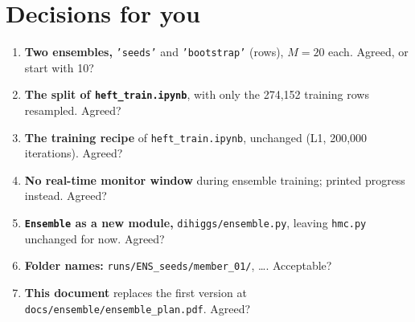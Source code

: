 \documentclass[11pt]{article}
\newcommand{\file}[1]{\nolinkurl{#1}}
\newcommand{\code}[1]{\texttt{#1}}
\begin{document}
\section{Decisions for you}
\label{sec:decisions}

\begin{keyidea}
\begin{enumerate}
  \item \textbf{Two ensembles,} \code{'seeds'} and \code{'bootstrap'} (rows), $M = 20$
    each. Agreed, or start with 10?
  \item \textbf{The split of \file{heft_train.ipynb}}, with only the 274,152 training rows
    resampled. Agreed?
  \item \textbf{The training recipe} of \file{heft_train.ipynb}, unchanged (L1, 200,000
    iterations). Agreed?
  \item \textbf{No real-time monitor window} during ensemble training; printed progress
    instead. Agreed?
  \item \textbf{\code{Ensemble} as a new module,} \file{dihiggs/ensemble.py}, leaving
    \file{hmc.py} unchanged for now. Agreed?
  \item \textbf{Folder names:} \file{runs/ENS_seeds/member_01/}, \ldots. Acceptable?
  \item \textbf{This document} replaces the first version at
    \file{docs/ensemble/ensemble_plan.pdf}. Agreed?
\end{enumerate}
\end{keyidea}
\end{document}
